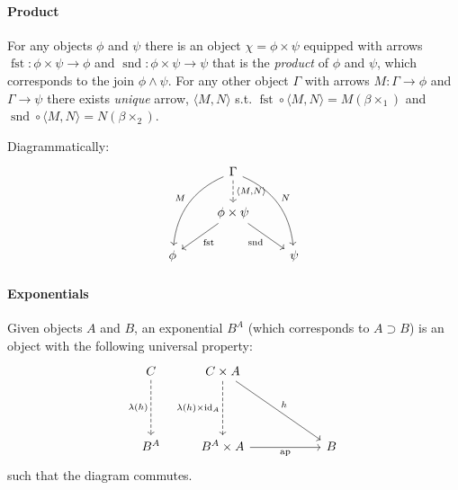 \paragraph{Product} 
For any objects $\phi$ and $\psi$ there is an object $\chi=\phi\times \psi$ equipped with arrows $\operatorname{fst}:\phi\times\psi\to\phi$ and $\operatorname{snd}:\phi\times\psi\to\psi$ that is the \emph{product} of $\phi$ and $\psi$, which corresponds to the join $\phi\wedge \psi$. For any other object $\Gamma$ with arrows $M:\Gamma\to\phi$ and $\Gamma\to\psi$ there  exists \emph{unique} arrow, $\langle M,N \rangle$ s.t. $\operatorname{fst}\circ\langle M, N\rangle=M(\beta\times_1)$ and
$\operatorname{snd}\circ\langle M, N\rangle=N(\beta\times_2)$.
\begin{mdframed}
Diagrammatically:
\begin{equation*}
  \begin{tikzcd}
    {} & \Gamma \arrow[bend right]{ddl}[swap]{M} \arrow[bend left]{ddr}{N}\dar[dashed]{\langle M,N\rangle} & {} \\
    {} & \phi \times \psi \dlar{\text{fst}}\drar[swap]{\text{snd}} & {} \\
    \phi & {} & \psi
  \end{tikzcd}
\end{equation*}
\end{mdframed}




\paragraph{Exponentials}
Given objects $A$ and $B$, an exponential $B^A$ (which corresponds to $A\supset B$) is an object with the following universal property:
\[
\begin{tikzcd}
C \arrow[dashed]{dd}[swap]{\lambda(h)}&{C\times A}\arrow{ddrr}{h} \arrow[dashed]{dd}[swap]{\lambda(h)\times \operatorname{id}_A} &&\\
&& {}	&{}\\
B^A&{B^A\times A}\arrow{rr}[swap]{\operatorname{ap}} &{}&{B}
\end{tikzcd}
\]
such that the diagram commutes.

